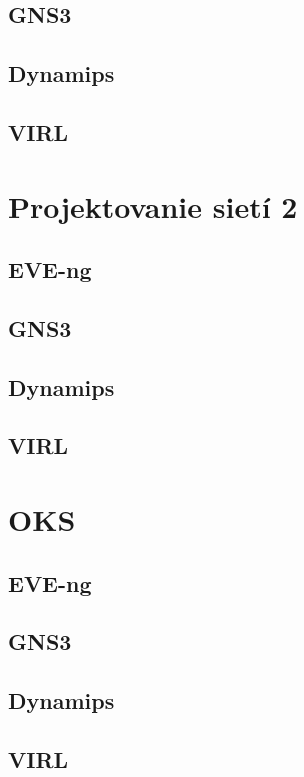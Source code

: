 \subsection{GNS3}
\subsection{Dynamips}
\subsection{VIRL}

\clearpage

\section{Projektovanie sietí 2}
\subsection{EVE-ng}
\subsection{GNS3}
\subsection{Dynamips}
\subsection{VIRL}

\clearpage

\section{OKS}
\subsection{EVE-ng}
\subsection{GNS3}
\subsection{Dynamips}
\subsection{VIRL}